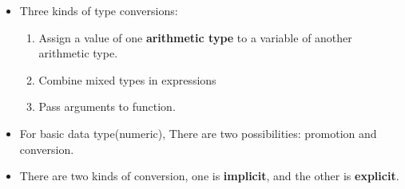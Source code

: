 \documentclass[a4paper,12pt,twoside]{book}
\begin{document}
\begin{itemize}
\item Three kinds of type conversions:
\begin{enumerate}
\item Assign a value of one \textbf{arithmetic type} to a variable of another arithmetic type.
\item Combine mixed types in expressions
\item Pass arguments to function.
\end{enumerate}

\item For basic data type(numeric), There are two possibilities: promotion and conversion.

\item There are two kinds of conversion, one is \textbf{implicit}, and the other is \textbf{explicit}.
\end{itemize}
\end{document}
